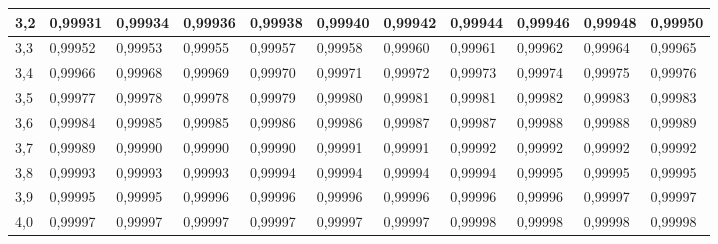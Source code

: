 \documentclass[12pt,a4paper]{article}
\begin{document}
\begin{tabular}{l|l|l|l|l|l|l|l|l|l|l}
3,2 & 0,99931 & 0,99934 & 0,99936 & 0,99938 & 0,99940 & 0,99942 & 0,99944 & 0,99946 & 0,99948 & 0,99950\\ \hline
3,3 & 0,99952 & 0,99953 & 0,99955 & 0,99957 & 0,99958 & 0,99960 & 0,99961 & 0,99962 & 0,99964 & 0,99965\\ \hline
3,4 & 0,99966 & 0,99968 & 0,99969 & 0,99970 & 0,99971 & 0,99972 & 0,99973 & 0,99974 & 0,99975 & 0,99976\\ \hline
3,5 & 0,99977 & 0,99978 & 0,99978 & 0,99979 & 0,99980 & 0,99981 & 0,99981 & 0,99982 & 0,99983 & 0,99983\\ \hline
3,6 & 0,99984 & 0,99985 & 0,99985 & 0,99986 & 0,99986 & 0,99987 & 0,99987 & 0,99988 & 0,99988 & 0,99989\\ \hline
3,7 & 0,99989 & 0,99990 & 0,99990 & 0,99990 & 0,99991 & 0,99991 & 0,99992 & 0,99992 & 0,99992 & 0,99992\\ \hline
3,8 & 0,99993 & 0,99993 & 0,99993 & 0,99994 & 0,99994 & 0,99994 & 0,99994 & 0,99995 & 0,99995 & 0,99995\\ \hline
3,9 & 0,99995 & 0,99995 & 0,99996 & 0,99996 & 0,99996 & 0,99996 & 0,99996 & 0,99996 & 0,99997 & 0,99997\\ \hline
4,0 & 0,99997 & 0,99997 & 0,99997 & 0,99997 & 0,99997 & 0,99997 & 0,99998 & 0,99998 & 0,99998 & 0,99998

\end{tabular}
\end{document}
